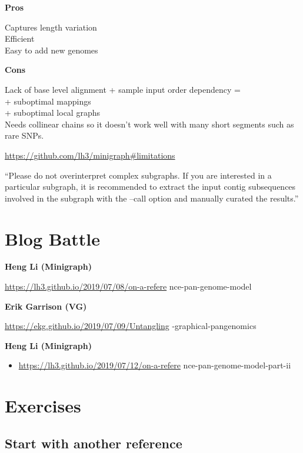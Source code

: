 \documentclass[
]{book}
\providecommand{\tightlist}{%
  \setlength{\itemsep}{0pt}\setlength{\parskip}{0pt}}
\begin{document}
\textbf{Pros}

Captures length variation\\
Efficient\\
Easy to add new genomes

\textbf{Cons}

Lack of base level alignment + sample input order dependency =\\
+ suboptimal mappings\\
+ suboptimal local graphs\\
Needs collinear chains so it doesn't work well with many short segments such as rare SNPs.

\url{https://github.com/lh3/minigraph\#limitations}

``Please do not overinterpret complex subgraphs. If you are interested in a particular subgraph, it is recommended to extract the input contig subsequences involved in the subgraph with the --call option and manually curated the results.''

\hypertarget{blog-battle}{%
\section{Blog Battle}\label{blog-battle}}

\textbf{Heng Li (Minigraph)}

\url{https://lh3.github.io/2019/07/08/on-a-refere} nce-pan-genome-model

\textbf{Erik Garrison (VG)}

\url{https://ekg.github.io/2019/07/09/Untangling} -graphical-pangenomics

\textbf{Heng Li (Minigraph)}

\begin{itemize}
\tightlist
\item
  \url{https://lh3.github.io/2019/07/12/on-a-refere} nce-pan-genome-model-part-ii
\end{itemize}

\hypertarget{exercises}{%
\section{Exercises}\label{exercises}}

\hypertarget{start-with-another-reference}{%
\subsection*{Start with another reference}\label{start-with-another-reference}}
\end{document}
